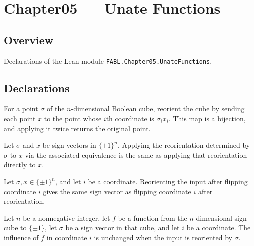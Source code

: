 \chapter{Chapter05 — Unate Functions}
\section{Overview}

Declarations of the Lean module \texttt{FABL.Chapter05.UnateFunctions}.

\section{Declarations}

\begin{definition}
\label{FABL.reorientInputEquiv}
\leanok
For a point $\sigma$ of the $n$-dimensional Boolean cube, reorient the cube by sending
each point $x$ to the point whose $i$th coordinate is $\sigma_i x_i$. This map is a
bijection, and applying it twice returns the original point.
\end{definition}

\begin{theorem}
\label{FABL.reorientInputEquiv_apply}
\leanok
{}
Let $\sigma$ and $x$ be sign vectors in $\{\pm1\}^n$. Applying the reorientation
determined by $\sigma$ to $x$ via the associated equivalence is the same as applying
that reorientation directly to $x$.
\end{theorem}

\begin{theorem}
\label{FABL.reorientInput_flipCoordinate}
\leanok
{}
Let $\sigma,x\in\{\pm1\}^n$, and let $i$ be a coordinate. Reorienting the input after
flipping coordinate $i$ gives the same sign vector as flipping coordinate $i$ after
reorientation.
\end{theorem}

\begin{theorem}
\label{FABL.booleanInfluence_comp_reorientInput}
\leanok
{}
Let $n$ be a nonnegative integer, let $f$ be a function from the $n$-dimensional sign
cube to $\{\pm1\}$, let $\sigma$ be a sign vector in that cube, and let $i$ be a
coordinate. The influence of $f$ in coordinate $i$ is unchanged when the input is
reoriented by $\sigma$.
\end{theorem}

